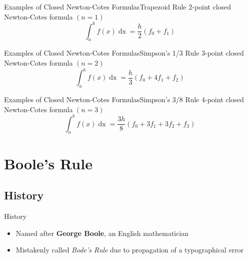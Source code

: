 \documentclass{beamer}
\begin{document}
\begin{frame}{Examples of Closed Newton-Cotes Formulas}{Trapezoid Rule}
    2-point closed Newton-Cotes formula $\left(n = 1\right)$
    \begin{equation}
      \int_a^b f(x) \mathop{dx} = \dfrac{h}{2} \left(f_0 + f_1\right)
    \end{equation}
\end{frame}

\begin{frame}{Examples of Closed Newton-Cotes Formulas}{Simpson's 1/3 Rule}
    3-point closed Newton-Cotes formula $\left(n = 2\right)$
    \begin{equation}
      \int_a^b f(x) \mathop{dx} = \dfrac{h}{3} \left(f_0 + 4f_1 + f_2\right)
    \end{equation}
\end{frame}

\begin{frame}{Examples of Closed Newton-Cotes Formulas}{Simpson's 3/8 Rule}
    4-point closed Newton-Cotes formula $\left(n = 3\right)$
    \begin{equation}
      \int_a^b f(x) \mathop{dx} = \dfrac{3h}{8} \left(f_0 + 3f_1 + 3f_2 + f_3\right)
    \end{equation}
\end{frame}


\section{Boole's Rule}

\subsection{History}

\begin{frame}{History \cite{booles_history}}
  \begin{itemize}
    \item Named after \textbf{George Boole}, an English mathematician
    \item Mistakenly called \textit{Bode's Rule} due to propagation of a typographical error
  \end{itemize}
\end{frame}
\end{document}
